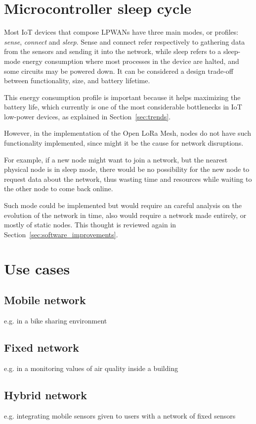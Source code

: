 	\section{Microcontroller sleep cycle}\label{sec:sleep}
	
		Most IoT devices that compose LPWANs have three main modes, or profiles: \textit{sense}, \textit{connect} and \textit{sleep}.
		Sense and connect refer respectively to gathering data from the sensors and sending it into the network, while sleep refers to a sleep-mode energy consumption where most processes in the device are halted, and some circuits may be powered down.
		It can be considered a design trade-off between functionality, size, and battery lifetime.
		
		This energy consumption profile is important because it helps maximizing the battery life, which currently is one of the most considerable bottlenecks in IoT low-power devices, as explained in Section~\ref{sec:trends}.
		
		However, in the implementation of the Open LoRa Mesh, nodes do not have such functionality implemented, since might it be the cause for network disruptions.
		
		For example, if a new node might want to join a network, but the nearest physical node is in sleep mode, there would be no possibility for the new node to request data about the network, thus wasting time and resources while waiting to the other node to come back online.
		
		Such mode could be implemented but would require an careful analysis on the evolution of the network in time, also would require a network made entirely, or mostly of static nodes.
		This thought is reviewed again in Section~\ref{sec:software_improvements}.
			
	\section{Use cases}
		
		\subsection{Mobile network}
		
			e.g. in a bike sharing environment
		
		\subsection{Fixed network}
		
			e.g. in a monitoring values of air quality inside a building
		
		\subsection{Hybrid network}
		
			e.g. integrating mobile sensors given to users with a network of fixed sensors